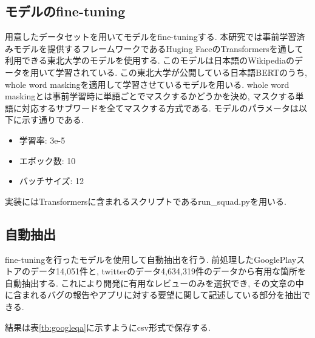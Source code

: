 \subsection{モデルのfine-tuning}
用意したデータセットを用いてモデルをfine-tuningする. 本研究では事前学習済みモデルを提供するフレームワークであるHuging FaceのTransformersを通して利用できる東北大学のモデル\cite{tohoku}を使用する. このモデルは日本語のWikipediaのデータを用いて学習されている\cite{tohoku}. 
この東北大学が公開している日本語BERTのうち, whole word maskingを適用して学習させているモデル\cite{masking}を用いる. whole word maskingとは事前学習時に単語ごとでマスクするかどうかを決め, マスクする単語に対応するサブワードを全てマスクする方式である. モデルのパラメータは以下に示す通りである. 
\begin{itemize}
  \item 学習率: 3e-5
  \item エポック数: 10
  \item バッチサイズ: 12
\end{itemize}

実装にはTransformersに含まれるスクリプトであるrun\_squad.pyを用いる. 

\subsection{自動抽出}
fine-tuningを行ったモデルを使用して自動抽出を行う. 前処理したGooglePlayストアのデータ14,051件と, twitterのデータ4,634,319件のデータから有用な箇所を自動抽出する. これにより開発に有用なレビューのみを選択でき, その文章の中に含まれるバグの報告やアプリに対する要望に関して記述している部分を抽出できる. 

結果は表\ref{tb:googleqa}に示すようにcsv形式で保存する. 


